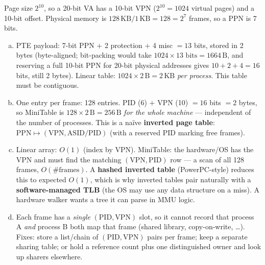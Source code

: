 \documentclass[11pt,a4paper]{article}
\newenvironment{Sol}{%
  \begin{tcolorbox}[sboxstyle, title={Solution}]%
}{%
  \end{tcolorbox}\vspace{0.35em}%
}
\begin{document}
\begin{Sol}
Page size $2^{10}$, so a 20-bit VA has a 10-bit VPN ($2^{10}=1024$ virtual
pages) and a 10-bit offset. Physical memory is $128\,\mathrm{KB}/1\,\mathrm{KB}
= 128 = 2^7$ frames, so a PPN is 7 bits.
\begin{enumerate}[(a)]
\item PTE payload: 7-bit PPN $+$ 2 protection $+$ 4 misc $= 13$ bits,
      stored in 2 bytes (byte-aligned; bit-packing would take
      $1024\times 13\text{ bits}=1664\,\mathrm{B}$, and reserving a full
      10-bit PPN for 20-bit physical addresses gives $10+2+4=16$ bits,
      still 2 bytes). Linear table:
      $1024\times 2\,\mathrm{B} = 2\,\mathrm{KB}$
      \emph{per process}. This table must be contiguous.
\item One entry per frame: 128 entries. PID (6) $+$ VPN (10) $= 16$ bits
      $= 2$ bytes, so MiniTable is
      $128\times 2\,\mathrm{B} = 256\,\mathrm{B}$
      \emph{for the whole machine} --- independent of the number of
      processes.       This is a na\"ive \textbf{inverted page table}:
      $\mathrm{PPN}\mapsto(\mathrm{VPN},\mathrm{ASID/PID})$ (with a
      reserved PID marking free frames).
\item Linear array: $O(1)$ (index by VPN). MiniTable: the hardware/OS
      has the VPN and must find the matching $(\mathrm{VPN},\mathrm{PID})$
      row --- a scan of all 128 frames, $O(\#\textrm{frames})$. A
      \textbf{hashed inverted table} (PowerPC-style) reduces this to
      expected $O(1)$, which is why inverted tables pair naturally with
      a \textbf{software-managed TLB} (the OS may use any data structure
      on a miss). A hardware walker wants a tree it can parse in MMU
      logic.
\item Each frame has a \emph{single} $(\mathrm{PID},\mathrm{VPN})$ slot,
      so it cannot record that process A \emph{and} process B both map
      that frame (shared library, copy-on-write, \ldots). Fixes: store a
      list/chain of $(\mathrm{PID},\mathrm{VPN})$ pairs per frame; keep a
      separate sharing table; or hold a reference count plus one
      distinguished owner and look up sharers elsewhere.
\end{enumerate}
\end{Sol}
\end{document}
